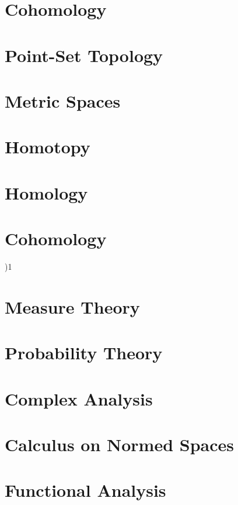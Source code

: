 \documentclass{book}                                                           %
\newcommand*{\TOPPATH}{books}
\newcommand*{\PATH}{\TOPPATH/}
\newcounter{endpage}
\def\compileanalysis{)}
\begin{document}
        \part{Cohomology}
    \else
        \part{Point-Set Topology}
        \part{Metric Spaces}
        \part{Homotopy}
        \part{Homology}
        \part{Cohomology}
    \fi
    \clearpage

    \setcounter{endpage}{\thepage}
    \label{book:Analysis}%
    \renewcommand{\PATH}{\TOPPATH/Analysis}
    \setcounter{page}{\value{endpage}}

    \if\compileanalysis1
        \part{Measure Theory}
            
        \part{Probability Theory}
            
        \part{Complex Analysis}
            
        \part{Calculus on Normed Spaces}
            
        \part{Functional Analysis}
            
\end{document}
